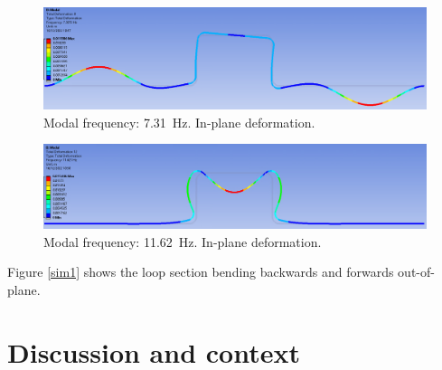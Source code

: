 \begin{figure}[H]
    \centering
    \includegraphics[width = 0.9 \textwidth]{img/fig19.png}
    \caption{Modal frequency: \SI{7.31}{\hertz}. In-plane deformation.}
    \label{sim9}
\end{figure}

\begin{figure}[H]
    \centering
    \includegraphics[width = 0.9 \textwidth]{img/fig22.png}
    \caption{Modal frequency: \SI{11.62}{\hertz}. In-plane deformation.}
    \label{sim12}
\end{figure}
Figure \ref{sim1} shows the loop section bending backwards and forwards out-of-plane.
\section{Discussion and context}